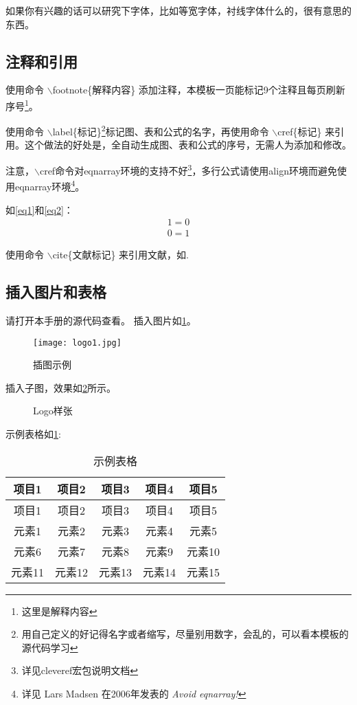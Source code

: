 如果你有兴趣的话可以研究下字体，比如等宽字体，衬线字体什么的，很有意思的东西。

\subsection{注释和引用}
使用命令 $\backslash$footnote\{解释内容\} 添加注释，本模板一页能标记9个注释且每页刷新序号\footnote{这里是解释内容}。

使用命令 $\backslash$label\{标记\}\footnote{用自己定义的好记得名字或者缩写，尽量别用数字，会乱的，可以看本模板的源代码学习}标记图、表和公式的名字，再使用命令 $\backslash$cref\{标记\} 来引用。这个做法的好处是，全自动生成图、表和公式的序号，无需人为添加和修改。

注意，$\backslash$cref命令对eqnarray环境的支持不好\footnote{详见cleveref宏包说明文档}，多行公式请使用align环境而避免使用eqnarray环境\footnote{详见 Lars Madsen 在2006年发表的 \emph{Avoid eqnarray!} }。

如\cref{eq1}和\cref{eq2}：
\begin{align}
1=0\label{eq1}\\
0=1\label{eq2}
\end{align}

使用命令 $\backslash$cite\{文献标记\} 来引用文献，如\cite{yfbt}.

\subsection{插入图片和表格}
请打开本手册的源代码查看。
插入图片如\cref{fig.ex1}。
\begin{figure}[htbp]
	\centering\texttt{[image: logo1.jpg]}
	\caption{插图示例}\label{fig.ex1}
\end{figure}

插入子图，效果如\cref{fig.ex2}所示。
\begin{figure}[htbp]
	\centering
	\caption{Logo样张}
	\label{fig.ex2}
\end{figure}

示例表格如\cref{bg}:
\begin{longtable}{|c|c|c|c|c|}
	\caption{示例表格\label{bg}}\\
    \hline
    项目1 & 项目2 & 项目3 & 项目4 & 项目5 \\
	\hline
	\endfirsthead %
	\hline
	项目1 & 项目2 & 项目3 & 项目4 & 项目5 \\
	\hline
	\endhead %
	\hline   %
	\endfoot %
    元素1 & 元素2 & 元素3 & 元素4 & 元素5 \\
    \hline
    元素6 & 元素7 & 元素8 & 元素9 & 元素10 \\
    \hline
    元素11 & 元素12 & 元素13 & 元素14 & 元素15 \\
\end{longtable}

